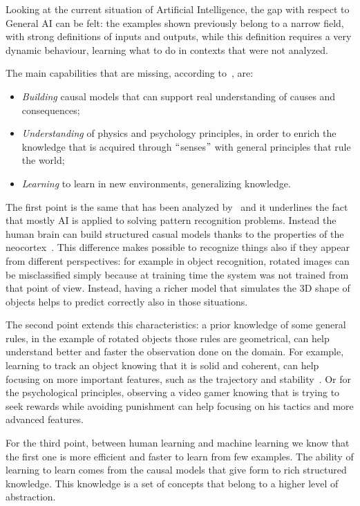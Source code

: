 Looking at the current situation of Artificial Intelligence, the gap with respect to General AI can be felt: the examples shown previously belong to a narrow field, with strong definitions of inputs and outputs, while this definition requires a very dynamic behaviour, learning what to do in contexts that were not analyzed.

The main capabilities that are missing, according to~\cite{lake2017building}, are:

\begin{itemize}
	\item \textit{Building} causal models that can support real understanding of causes and consequences;

	\item \textit{Understanding} of physics and psychology principles, in order to enrich the knowledge that is acquired through $``$senses$"$  with general principles that rule the world;

	\item \textit{Learning} to learn in new environments, generalizing knowledge.
\end{itemize}

The first point is the same that has been analyzed by~\cite{pearl2018theoretical} and it underlines the fact that mostly AI is applied to solving pattern recognition problems. Instead the human brain can build structured casual models thanks to the properties of the neocortex~\cite{hawkins2017theory}. This difference makes possible to recognize things also if they appear from different perspectives: for example in object recognition, rotated images can be misclassified simply because at training time the system was not trained from that point of view. Instead, having a richer model that simulates the 3D shape of objects helps to predict correctly also in those situations.

The second point extends this characteristics: a prior knowledge of some general rules, in the example of rotated objects those rules are geometrical, can help understand better and faster the observation done on the domain. For example, learning to track an object knowing that it is solid and coherent, can help focusing on more important features, such as the trajectory and stability~\cite{lerer2016learning}. Or for the psychological principles, observing a video gamer knowing that is trying to seek rewards while avoiding punishment can help focusing on his tactics and more advanced features.

For the third point, between human learning and machine learning we know that the first one is more efficient and faster to learn from few examples. The ability of learning to learn comes from the causal models that give form to rich structured knowledge. This knowledge is a set of concepts that belong to a higher level of abstraction.

